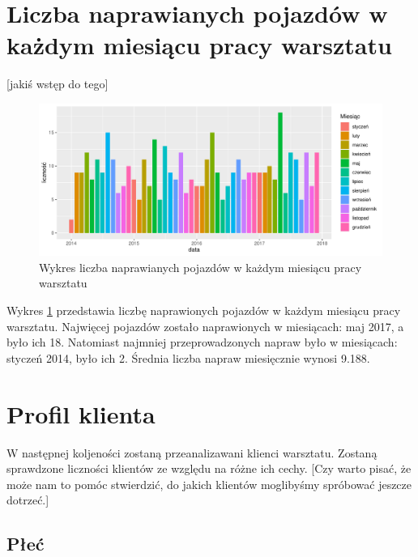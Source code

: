 \documentclass{article}\usepackage[]{graphicx}\usepackage[]{xcolor}
\makeatletter
\def\maxwidth{ %
  \ifdim\Gin@nat@width>\linewidth
    \linewidth
  \else
    \Gin@nat@width
  \fi
}
\newenvironment{knitrout}{}{} %
\makeatother
\begin{document}
\section{Liczba naprawianych pojazdów w każdym miesiącu pracy warsztatu}

{\color{red}[jakiś wstęp do tego]}

\begin{knitrout}
\color{fgcolor}\begin{figure}[h]

{\centering \includegraphics[width=\maxwidth]{figure/fig_naprawy_miesiecznie-1} 

}

\caption[Wykres liczba naprawianych pojazdów w każdym miesiącu pracy warsztatu]{Wykres liczba naprawianych pojazdów w każdym miesiącu pracy warsztatu}\label{fig:fig_naprawy_miesiecznie}
\end{figure}

\end{knitrout}

Wykres \ref{fig:fig_naprawy_miesiecznie} przedstawia liczbę naprawionych pojazdów w każdym miesiącu pracy warsztatu. Najwięcej pojazdów zostało naprawionych w miesiącach: 
maj 2017,
a było ich 18. Natomiast najmniej przeprowadzonych napraw było w miesiącach:
styczeń 2014,
było ich 2. Średnia liczba napraw miesięcznie wynosi 
9.188. 

\section{Profil klienta}

W następnej koljeności zostaną przeanalizawani klienci warsztatu. Zostaną sprawdzone liczności klientów ze względu na różne ich cechy. {\color{red}[Czy warto pisać, że może nam to pomóc stwierdzić, do jakich klientów moglibyśmy spróbować jeszcze dotrzeć.]}

\subsection{Płeć}
\end{document}
